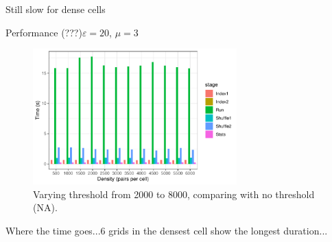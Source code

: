 \documentclass{beamer}
\begin{document}
\begin{frame}{Still slow for dense cells}
\begin{frame}{Performance (???)}{$\varepsilon=20$, $\mu=3$}
        \centering
        \begin{figure}
                \includegraphics[width=0.7\textwidth]{figures/Density/densityByStage}
                \caption{Varying threshold from 2000 to 8000, comparing with no threshold (NA).}
        \end{figure}
\end{frame}

\begin{frame}{Where the time goes...}{6 grids in the densest cell show the longest duration...}
        \centering
\end{frame}


\end{frame}
\end{document}
